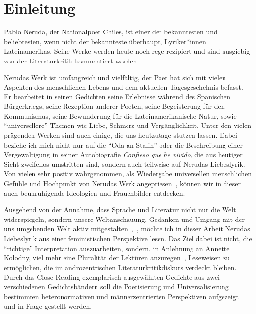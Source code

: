 \section{Einleitung}

Pablo Neruda, der Nationalpoet Chiles, ist einer der bekanntesten und beliebtesten, wenn nicht der bekannteste überhaupt, Lyriker*innen Lateinamerikas.
Seine Werke werden heute noch rege rezipiert und sind ausgiebig von der Literaturkritik kommentiert worden.


Nerudas Werk ist umfangreich und vielfältig, der Poet hat sich mit vielen Aspekten des menschlichen Lebens und dem aktuellen Tagesgeschehnis befasst.
Er bearbeitet in seinen Gedichten seine Erlebnisse während des Spanischen Bürgerkriegs, seine Rezeption anderer Poeten, seine Begeisterung für den Kommunismus, seine Bewunderung für die Lateinamerikanische Natur, sowie ``universellere'' Themen wie Liebe, Schmerz und Vergänglichkeit.
Unter den vielen prägenden Werken sind auch einige, die uns heutzutage stutzen lassen.
Dabei beziehe ich mich nicht nur auf die ``Oda an Stalin'' oder die Beschreibung einer Vergewaltigung in seiner Autobiografie \textit{Confieso que he vivido}, die aus heutiger Sicht zweifellos umstritten sind, sondern auch teilweise auf Nerudas Liebeslyrik.
Von vielen sehr positiv wahrgenommen, als Wiedergabe universellen menschlichen Gefühle und Hochpunkt von Nerudas Werk angepriesen~\cite{Eandi}, %
können wir in dieser auch beunruhigende Ideologien und Frauenbilder entdecken.


Ausgehend von der Annahme, dass Sprache und Literatur nicht nur die Welt widerspiegeln, sondern unsere Weltanschauung, Gedanken und Umgang mit der uns umgebenden Welt aktiv mitgestalten~\cite{Kolodny1980},~\cite{North2013},
möchte ich in dieser Arbeit Nerudas Liebeslyrik aus einer feministischen Perspektive lesen.
Das Ziel dabei ist nicht, die ``richtige'' Interpretation auszuarbeiten, sondern, in Anlehnung an Annette Kolodny, viel mehr eine Pluralität der Lektüren anzuregen~\cite{Kolodny1980}, Leseweisen zu ermöglichen, die im androzentrischen Literaturkritikdiskurs verdeckt bleiben.
Durch das Close Reading exemplarisch ausgewählten Gedichte aus zwei verschiedenen Gedichtsbändern soll die Poetisierung und Universalisierung bestimmten heteronormativen und männerzentrierten Perspektiven aufgezeigt und in Frage gestellt werden.


